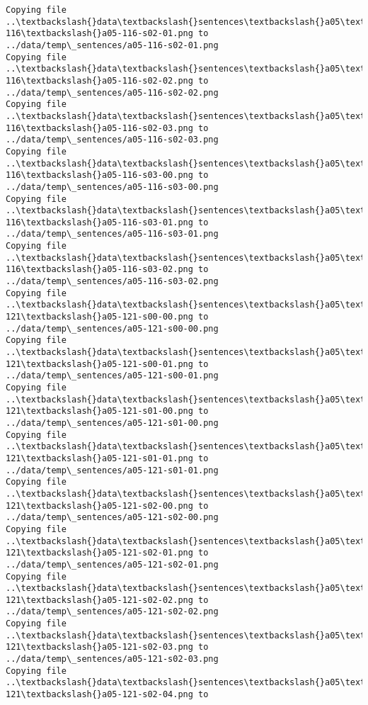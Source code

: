 \documentclass[11pt]{article}
\begin{document}
\begin{Verbatim}[commandchars=\\\{\}]
Copying file ..\textbackslash{}data\textbackslash{}sentences\textbackslash{}a05\textbackslash{}a05-116\textbackslash{}a05-116-s02-01.png to
../data/temp\_sentences/a05-116-s02-01.png
Copying file ..\textbackslash{}data\textbackslash{}sentences\textbackslash{}a05\textbackslash{}a05-116\textbackslash{}a05-116-s02-02.png to
../data/temp\_sentences/a05-116-s02-02.png
Copying file ..\textbackslash{}data\textbackslash{}sentences\textbackslash{}a05\textbackslash{}a05-116\textbackslash{}a05-116-s02-03.png to
../data/temp\_sentences/a05-116-s02-03.png
Copying file ..\textbackslash{}data\textbackslash{}sentences\textbackslash{}a05\textbackslash{}a05-116\textbackslash{}a05-116-s03-00.png to
../data/temp\_sentences/a05-116-s03-00.png
Copying file ..\textbackslash{}data\textbackslash{}sentences\textbackslash{}a05\textbackslash{}a05-116\textbackslash{}a05-116-s03-01.png to
../data/temp\_sentences/a05-116-s03-01.png
Copying file ..\textbackslash{}data\textbackslash{}sentences\textbackslash{}a05\textbackslash{}a05-116\textbackslash{}a05-116-s03-02.png to
../data/temp\_sentences/a05-116-s03-02.png
Copying file ..\textbackslash{}data\textbackslash{}sentences\textbackslash{}a05\textbackslash{}a05-121\textbackslash{}a05-121-s00-00.png to
../data/temp\_sentences/a05-121-s00-00.png
Copying file ..\textbackslash{}data\textbackslash{}sentences\textbackslash{}a05\textbackslash{}a05-121\textbackslash{}a05-121-s00-01.png to
../data/temp\_sentences/a05-121-s00-01.png
Copying file ..\textbackslash{}data\textbackslash{}sentences\textbackslash{}a05\textbackslash{}a05-121\textbackslash{}a05-121-s01-00.png to
../data/temp\_sentences/a05-121-s01-00.png
Copying file ..\textbackslash{}data\textbackslash{}sentences\textbackslash{}a05\textbackslash{}a05-121\textbackslash{}a05-121-s01-01.png to
../data/temp\_sentences/a05-121-s01-01.png
Copying file ..\textbackslash{}data\textbackslash{}sentences\textbackslash{}a05\textbackslash{}a05-121\textbackslash{}a05-121-s02-00.png to
../data/temp\_sentences/a05-121-s02-00.png
Copying file ..\textbackslash{}data\textbackslash{}sentences\textbackslash{}a05\textbackslash{}a05-121\textbackslash{}a05-121-s02-01.png to
../data/temp\_sentences/a05-121-s02-01.png
Copying file ..\textbackslash{}data\textbackslash{}sentences\textbackslash{}a05\textbackslash{}a05-121\textbackslash{}a05-121-s02-02.png to
../data/temp\_sentences/a05-121-s02-02.png
Copying file ..\textbackslash{}data\textbackslash{}sentences\textbackslash{}a05\textbackslash{}a05-121\textbackslash{}a05-121-s02-03.png to
../data/temp\_sentences/a05-121-s02-03.png
Copying file ..\textbackslash{}data\textbackslash{}sentences\textbackslash{}a05\textbackslash{}a05-121\textbackslash{}a05-121-s02-04.png to

\end{Verbatim}
\end{document}
